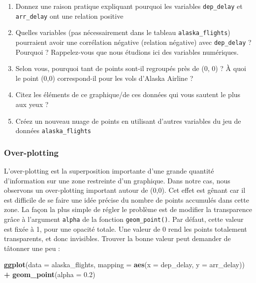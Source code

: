 \documentclass[a4paperpaper,]{article}
\newenvironment{Shaded}{\begin{snugshade}}{\end{snugshade}}
\newcommand{\KeywordTok}[1]{\textcolor[rgb]{0.13,0.29,0.53}{\textbf{#1}}}
\newcommand{\DataTypeTok}[1]{\textcolor[rgb]{0.13,0.29,0.53}{#1}}
\newcommand{\FloatTok}[1]{\textcolor[rgb]{0.00,0.00,0.81}{#1}}
\newcommand{\StringTok}[1]{\textcolor[rgb]{0.31,0.60,0.02}{#1}}
\newcommand{\OperatorTok}[1]{\textcolor[rgb]{0.81,0.36,0.00}{\textbf{#1}}}
\newcommand{\NormalTok}[1]{#1}
\providecommand{\tightlist}{%
  \setlength{\itemsep}{0pt}\setlength{\parskip}{0pt}}
\theoremstyle{definition}
\theoremstyle{definition}
\theoremstyle{definition}
\theoremstyle{remark}
\begin{document}
\begin{enumerate}
\def\labelenumi{\arabic{enumi}.}
\tightlist
\item
  Donnez une raison pratique expliquant pourquoi les variables
  \texttt{dep\_delay} et \texttt{arr\_delay} ont une relation positive
\item
  Quelles variables (pas nécessairement dans le tableau
  \texttt{alaska\_flights}) pourraient avoir une corrélation négative
  (relation négative) avec \texttt{dep\_delay} ? Pourquoi ?
  Rappelez-vous que nous étudions ici des variables numériques.
\item
  Selon vous, pourquoi tant de points sont-il regroupés près de (0, 0) ?
  À quoi le point (0,0) correspond-il pour les vols d'Alaska Airline ?
\item
  Citez les éléments de ce graphique/de ces données qui vous sautent le
  plus aux yeux ?
\item
  Créez un nouveau nuage de points en utilisant d'autres variables du
  jeu de données \texttt{alaska\_flights}
\end{enumerate}

\subsubsection{Over-plotting}\label{over-plotting}

L'over-plotting est la superposition importante d'une grande quantité
d'information sur une zone restreinte d'un graphique. Dans notre cas,
nous observons un over-plotting important autour de (0,0). Cet effet est
gênant car il est difficile de se faire une idée précise du nombre de
points accumulés dans cette zone. La façon la plus simple de régler le
problème est de modifier la transparence grâce à l'argument
\texttt{alpha} de la fonction \texttt{geom\_point()}. Par défaut, cette
valeur est fixée à 1, pour une opacité totale. Une valeur de 0 rend les
points totalement transparents, et donc invisibles. Trouver la bonne
valeur peut demander de tâtonner une peu :

\begin{Shaded}
\begin{Highlighting}[]
\KeywordTok{ggplot}\NormalTok{(}\DataTypeTok{data =}\NormalTok{ alaska_flights, }\DataTypeTok{mapping =} \KeywordTok{aes}\NormalTok{(}\DataTypeTok{x =}\NormalTok{ dep_delay, }\DataTypeTok{y =}\NormalTok{ arr_delay)) }\OperatorTok{+}\StringTok{ }
\StringTok{  }\KeywordTok{geom_point}\NormalTok{(}\DataTypeTok{alpha =} \FloatTok{0.2}\NormalTok{)}
\end{Highlighting}
\end{Shaded}
\end{document}
